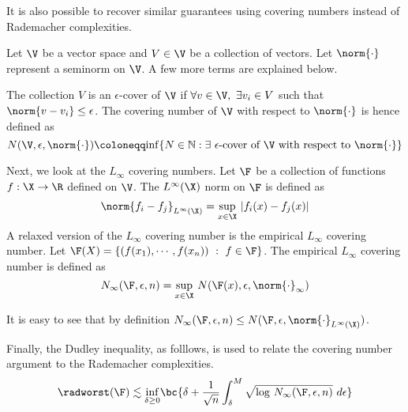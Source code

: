     It is also possible to recover similar guarantees using covering
    numbers instead of Rademacher complexities.
    \begin{example} \label{ex:cov_num}
      Let $\V$ be a vector space and $V\in\V$ be a collection of
      vectors. Let $\norm{\cdot}$ represent a seminorm on $\V$. A few
      more terms are explained below.

      The collection $V$ is an $\epsilon$-cover of $\V$ if
      $\forall v\in\V,~\exists v_i\in V$ such that
      $\norm{v - v_i}\le \epsilon$. The covering number of $\V$ with
      respect to $\norm{\cdot}$ is hence defined as
      \[N(\V,\epsilon,\norm{\cdot})\coloneqq
        \mathrm{inf}\{N\in\mathbb{N} : \exists~\epsilon\text{-cover of
          $\V$ with respect to }\norm{\cdot} \}\]
    
      Next, we look at the $L_\infty$ covering numbers. Let $\F$ be a
      collection of functions $f:\X\rightarrow\R$ defined on $\V$. The
      $L^{\infty}(\X)$ norm on $\F$ is defined as
      \[\norm{f_i-f_j}_{L^{\infty}(\X)} =
        \underset{x\in\X}{\mathrm{sup}}~|f_i(x) - f_j(x)|\] A relaxed
      version of the $L_\infty$ covering number is the empirical
      $L_\infty$ covering number. Let
      $\F(X) = \{(f(x_1),\cdots,f(x_n))~:~f\in\F\}$. The empirical
      $L_\infty$ covering number is defined as
      \[N_{\infty}(\F,\epsilon, n) =
        \underset{x\in\X}{\mathrm{sup}}~N(\F(x),\epsilon,\norm{\cdot}_{\infty})\]
    
      It is easy to see that by definition
      $N_{\infty}(\F,\epsilon, n) \le N(\F, \epsilon,
      \norm{\cdot}_{L^{\infty}(\X)})$.

      Finally, the Dudley inequality, as folllows, is used to relate
      the covering number argument to the Rademacher complexities.
      \[\radworst(\F) \lesssim\underset{\delta\ge 0}{\mathrm{inf}}
        \bc{\delta +
          \dfrac{1}{\sqrt{n}}\int_{\delta}^M\sqrt{\mathrm{log}~N_{\infty}(\F,\epsilon,n)}~d\epsilon}\]


\end{example}
